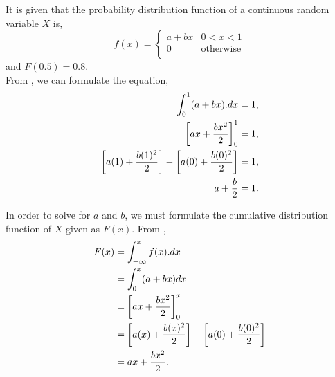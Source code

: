 %
%

\begin{subquestions}
	
\subquestion

\begin{subsubquestions}
	
\subsubquestion
It is given that the probability distribution function of a continuous random variable $X$ is,
\[
f(x) =
\begin{cases}
	a+bx & \text{$0<x<1$} \\
	0    & \text{otherwise} \\
\end{cases}
\]
and $F(0.5)=0.8.$ \\

From , we can formulate the equation,
\begin{align}
	\int_{0}^{1} (a+bx).dx = 1, \nonumber \\
	\left[ax + \frac{bx^2}{2}\right]_0^1 = 1, \nonumber \\
	\left[a(1) + \frac{b(1)^2}{2}\right] - \left[a(0) + \frac{b(0)^2}{2}\right]= 1, \nonumber \\
	a + \frac{b}{2} = 1. \label{2015:q4:eqn:crv1}
\end{align}

In order to solve for $a$ and $b$, we must formulate the cumulative distribution function of $X$ given as $F(x)$. From , 
\begin{align}
	F(x) & = \int_{-\infty}^{x} f(x).dx \nonumber \\
	     & = \int_{0}^{x} (a+bx)dx \nonumber \\
	     & = \left[ax + \frac{bx^2}{2}\right]_0^x \nonumber \\
	     & = \left[a(x) + \frac{b(x)^2}{2}\right] - \left[a(0) + \frac{b(0)^2}{2}\right] \nonumber \\
	     & = ax + \frac{bx^2}{2}.
\end{align}


\end{subsubquestions}
\end{subquestions}
